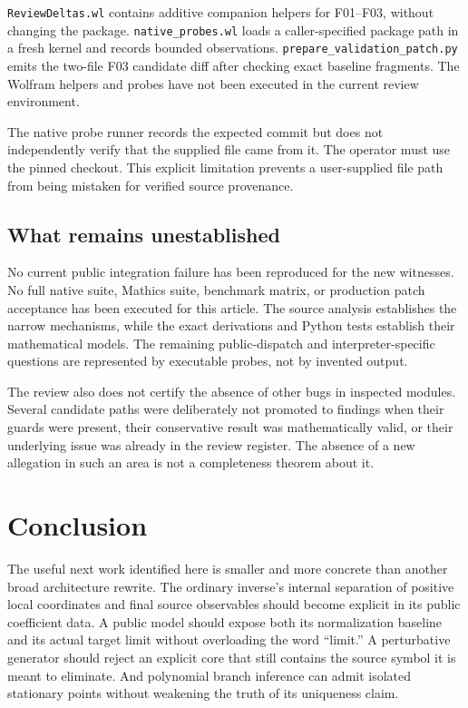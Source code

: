 \documentclass[11pt,letterpaper]{article}
\newcommand{\code}[1]{\nolinkurl{#1}}
\begin{document}
\code{ReviewDeltas.wl} contains additive companion helpers for F01--F03, without changing the package. \code{native_probes.wl} loads a caller-specified package path in a fresh kernel and records bounded observations. \code{prepare_validation_patch.py} emits the two-file F03 candidate diff after checking exact baseline fragments. The Wolfram helpers and probes have not been executed in the current review environment.

The native probe runner records the expected commit but does not independently verify that the supplied file came from it. The operator must use the pinned checkout. This explicit limitation prevents a user-supplied file path from being mistaken for verified source provenance.

\subsection{What remains unestablished}
No current public integration failure has been reproduced for the new witnesses. No full native suite, Mathics suite, benchmark matrix, or production patch acceptance has been executed for this article. The source analysis establishes the narrow mechanisms, while the exact derivations and Python tests establish their mathematical models. The remaining public-dispatch and interpreter-specific questions are represented by executable probes, not by invented output.

The review also does not certify the absence of other bugs in inspected modules. Several candidate paths were deliberately not promoted to findings when their guards were present, their conservative result was mathematically valid, or their underlying issue was already in the review register. The absence of a new allegation in such an area is not a completeness theorem about it.

\section{Conclusion}
The useful next work identified here is smaller and more concrete than another broad architecture rewrite. The ordinary inverse's internal separation of positive local coordinates and final source observables should become explicit in its public coefficient data. A public model should expose both its normalization baseline and its actual target limit without overloading the word ``limit.'' A perturbative generator should reject an explicit core that still contains the source symbol it is meant to eliminate. And polynomial branch inference can admit isolated stationary points without weakening the truth of its uniqueness claim.
\end{document}

